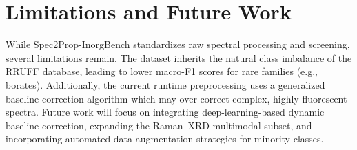 \section{Limitations and Future Work}
\label{sec:limitations}

While Spec2Prop-InorgBench standardizes raw spectral processing and screening, several limitations remain. The dataset inherits the natural class imbalance of the RRUFF database, leading to lower macro-F1 scores for rare families (e.g., borates). Additionally, the current runtime preprocessing uses a generalized baseline correction algorithm which may over-correct complex, highly fluorescent spectra. Future work will focus on integrating deep-learning-based dynamic baseline correction, expanding the Raman--XRD multimodal subset, and incorporating automated data-augmentation strategies for minority classes. 


